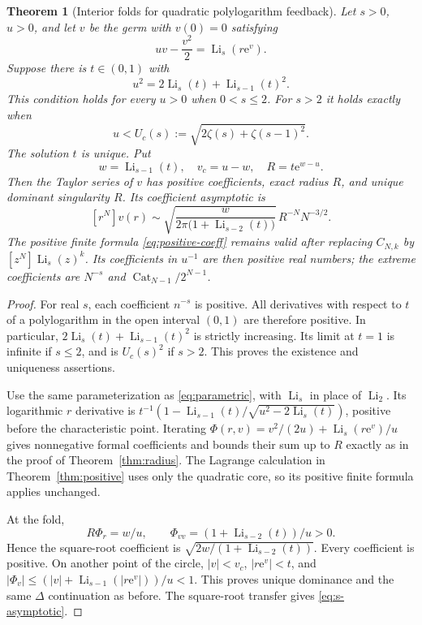 \documentclass[11pt,a4paper]{article}
\newtheorem{theorem}{Theorem}[section]
\theoremstyle{definition}\newtheorem{definition}[theorem]{Definition}
\theoremstyle{remark}\newtheorem{remark}[theorem]{Remark}
\newcommand{\Li}{\operatorname{Li}}
\newcommand{\ee}{\mathrm e}
\newcommand{\coeff}[2]{[#1^{#2}]}
\numberwithin{equation}{section}
\begin{document}
\begin{theorem}[Interior folds for quadratic polylogarithm feedback]\label{thm:feedback}
Let $s>0$, $u>0$, and let $v$ be the germ with $v(0)=0$ satisfying
\begin{equation}\label{eq:feedback}
 uv-\frac{v^2}{2}=\Li_s(r\ee^v).
\end{equation}
Suppose there is $t\in(0,1)$ with
\begin{equation}\label{eq:s-characteristic}
 u^2=2\Li_s(t)+\Li_{s-1}(t)^2.
\end{equation}
This condition holds for every $u>0$ when $0<s\le2$. For $s>2$ it holds
exactly when
\begin{equation}\label{eq:Uc}
 u<U_c(s):=\sqrt{2\zeta(s)+\zeta(s-1)^2}.
\end{equation}
The solution $t$ is unique. Put
\begin{equation}\label{eq:s-radius}
 w=\Li_{s-1}(t),\quad v_c=u-w,\quad R=t\ee^{w-u}.
\end{equation}
Then the Taylor series of $v$ has positive coefficients, exact radius $R$,
and unique dominant singularity $R$. Its coefficient asymptotic is
\begin{equation}\label{eq:s-asymptotic}
 [r^N]v(r)\sim
 \sqrt{\frac{w}{2\pi\bigl(1+\Li_{s-2}(t)\bigr)}}\,
       R^{-N}N^{-3/2}.
\end{equation}
The positive finite formula \eqref{eq:positive-coeff} remains valid after
replacing $C_{N,k}$ by $\coeff{z}{N}\Li_s(z)^k$. Its coefficients in
$u^{-1}$ are then positive real numbers; the extreme coefficients are
$N^{-s}$ and $\operatorname{Cat}_{N-1}/2^{N-1}$.
\end{theorem}
\begin{proof}
For real $s$, each coefficient $n^{-s}$ is positive. All derivatives with
respect to $t$ of a polylogarithm in the open interval $(0,1)$ are
therefore positive. In particular,
$2\Li_s(t)+\Li_{s-1}(t)^2$ is strictly increasing. Its limit at $t=1$
is infinite if $s\le2$, and is $U_c(s)^2$ if $s>2$. This proves the
existence and uniqueness assertions.

Use the same parameterization as \eqref{eq:parametric}, with $\Li_s$
in place of $\Li_2$. Its logarithmic $r$ derivative is
$t^{-1}(1-\Li_{s-1}(t)/\sqrt{u^2-2\Li_s(t)})$, positive before the
characteristic point. Iterating
$\Phi(r,v)=v^2/(2u)+\Li_s(r\ee^v)/u$ gives nonnegative formal
coefficients and bounds their sum up to $R$ exactly as in the proof of
Theorem~\ref{thm:radius}. The Lagrange calculation in
Theorem~\ref{thm:positive} uses only the quadratic core, so its positive
finite formula applies unchanged.

At the fold,
\[
 R\Phi_r=w/u,\qquad \Phi_{vv}=(1+\Li_{s-2}(t))/u>0.
\]
Hence the square-root coefficient is
$\sqrt{2w/(1+\Li_{s-2}(t))}$.
Every coefficient is positive. On another point of the circle,
$|v|<v_c$, $|r\ee^v|<t$, and
$|\Phi_v|\le(|v|+\Li_{s-1}(|r\ee^v|))/u<1$.
This proves unique dominance and the same $\Delta$ continuation as before.
The square-root transfer gives \eqref{eq:s-asymptotic}.
\end{proof}
\end{document}
